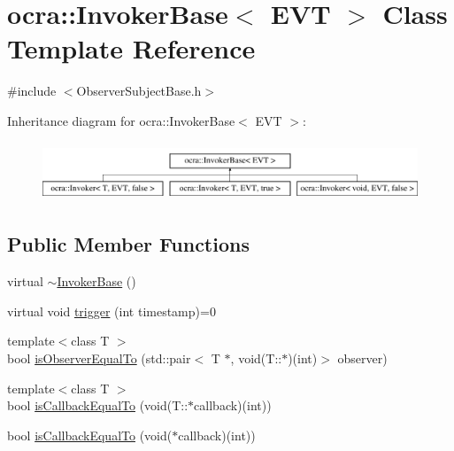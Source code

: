 \hypertarget{classocra_1_1InvokerBase}{}\section{ocra\+:\+:Invoker\+Base$<$ E\+VT $>$ Class Template Reference}
\label{classocra_1_1InvokerBase}


{\ttfamily \#include $<$Observer\+Subject\+Base.\+h$>$}

Inheritance diagram for ocra\+:\+:Invoker\+Base$<$ E\+VT $>$\+:\begin{figure}[H]
\begin{center}
\leavevmode
\includegraphics[height=1.769352cm]{d3/d04/classocra_1_1InvokerBase}
\end{center}
\end{figure}
\subsection*{Public Member Functions}
\begin{DoxyCompactItemize}
\item 
virtual \hyperlink{classocra_1_1InvokerBase_aa02504b95fda47269f5c42c4c7650a13}{$\sim$\+Invoker\+Base} ()
\item 
virtual void \hyperlink{classocra_1_1InvokerBase_ae4d7537a1b2c0aa9b5188c5da8423289}{trigger} (int timestamp)=0
\end{DoxyCompactItemize}
{\bf }\par
\begin{DoxyCompactItemize}
\item 
{\footnotesize template$<$class T $>$ }\\bool \hyperlink{classocra_1_1InvokerBase_a1ba940e9b5c9559fd7904dda940d2501}{is\+Observer\+Equal\+To} (std\+::pair$<$ T $\ast$, void(T\+::$\ast$)(int)$>$ observer)
\item 
{\footnotesize template$<$class T $>$ }\\bool \hyperlink{classocra_1_1InvokerBase_a4876ec9f3321e19fda7eb7f40befdf8e}{is\+Callback\+Equal\+To} (void(T\+::$\ast$callback)(int))
\item 
bool \hyperlink{classocra_1_1InvokerBase_a89f5d1ce29dcec8811e41e1e5992350d}{is\+Callback\+Equal\+To} (void($\ast$callback)(int))
\end{DoxyCompactItemize}

